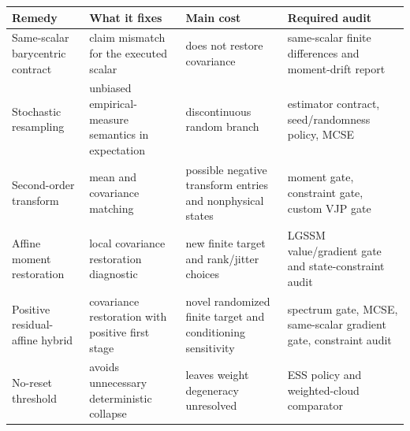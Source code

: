 \begin{center}
\scriptsize
\setlength{\tabcolsep}{3pt}
\begin{tabular}{@{}p{} p{} p{} p{}@{}}
\toprule
Remedy & What it fixes & Main cost & Required audit \\
\midrule
Same-scalar barycentric contract & claim mismatch for the executed scalar & does not restore covariance & same-scalar finite differences and moment-drift report \\
Stochastic resampling & unbiased empirical-measure semantics in expectation & discontinuous random branch & estimator contract, seed/randomness policy, MCSE \\
Second-order transform & mean and covariance matching & possible negative transform entries and nonphysical states & moment gate, constraint gate, custom VJP gate \\
Affine moment restoration & local covariance restoration diagnostic & new finite target and rank/jitter choices & LGSSM value/gradient gate and state-constraint audit \\
Positive residual-affine hybrid & covariance restoration with positive first stage & novel randomized finite target and conditioning sensitivity & spectrum gate, MCSE, same-scalar gradient gate, constraint audit \\
No-reset threshold & avoids unnecessary deterministic collapse & leaves weight degeneracy unresolved & ESS policy and weighted-cloud comparator \\
\bottomrule
\end{tabular}
\setlength{\tabcolsep}{6pt}
\normalsize
\end{center}

